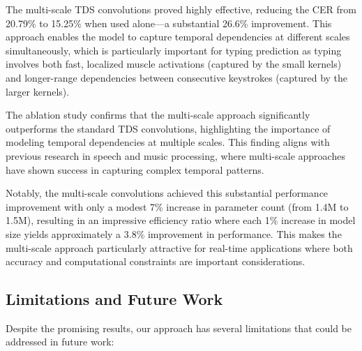 The multi-scale TDS convolutions proved highly effective, reducing the CER from 20.79\% to 15.25\% when used alone—a substantial 26.6\% improvement. This approach enables the model to capture temporal dependencies at different scales simultaneously, which is particularly important for typing prediction as typing involves both fast, localized muscle activations (captured by the small kernels) and longer-range dependencies between consecutive keystrokes (captured by the larger kernels).

The ablation study confirms that the multi-scale approach significantly outperforms the standard TDS convolutions, highlighting the importance of modeling temporal dependencies at multiple scales. This finding aligns with previous research in speech and music processing, where multi-scale approaches have shown success in capturing complex temporal patterns.

Notably, the multi-scale convolutions achieved this substantial performance improvement with only a modest 7\% increase in parameter count (from 1.4M to 1.5M), resulting in an impressive efficiency ratio where each 1\% increase in model size yields approximately a 3.8\% improvement in performance. This makes the multi-scale approach particularly attractive for real-time applications where both accuracy and computational constraints are important considerations.

\subsection{Limitations and Future Work}\label{subsec:limitations}

Despite the promising results, our approach has several limitations that could be addressed in future work:

